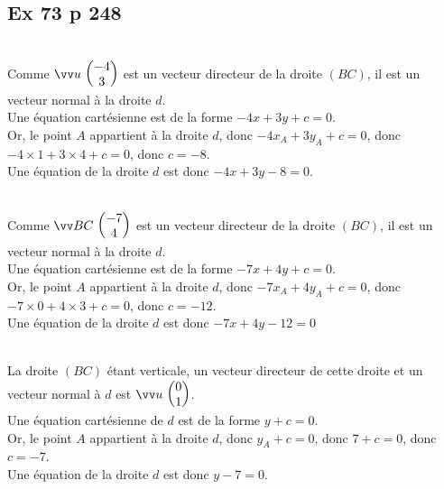 \documentclass[12pt,a4paper]{book}
\begin{document}
\subsection*{Ex 73 p 248}
\begin{enumMet}
    \item {}\\
    Comme $\Coord{u}{-4}{3}$ est un vecteur directeur de la droite $(B C)$, il est un vecteur normal à la droite $d$.\\
    Une équation cartésienne est de la forme $-4 x+3 y+c=0$.\\
    Or, le point $A$ appartient à la droite $d$, donc $-4 x_{A}+3 y_{A}+c=0$, donc $-4 \times 1+3 \times 4+c=0$, donc $c=-8$.\\
    Une équation de la droite $d$ est donc $-4 x+3 y-8=0$.
    \item {}\\
    Comme $\Coord{BC}{-7}{4}$  est un vecteur directeur de la droite $(B C)$, il est un vecteur normal à la droite $d$.\\
    Une équation cartésienne est de la forme $-7 x+4 y+c=0$.\\
    Or, le point $A$ appartient à la droite $d$, donc $-7 x_{A}+4 y_{A}+c=0$, donc $-7 \times 0+4 \times 3+c=0$, donc $c=-12$.\\
    Une équation de la droite $d$ est donc $-7 x+4 y-12=0$
    \item {}\\
    La droite $(B C)$ étant verticale, un vecteur directeur de cette droite et un vecteur normal à $d$ est $\Coord{u}{0}{1}$.\\
    Une équation cartésienne de $d$ est de la forme $y+c=0$.\\
    Or, le point $A$ appartient à la droite $d$, donc $y_{A}+c=0$, donc $7+c=0$, donc $c=-7$.\\
    Une équation de la droite $d$ est donc $y-7=0$.
\end{enumMet}
\end{document}
